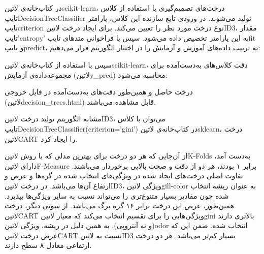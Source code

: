 \documentclass[a4paper,12pt]{article}
\begin{document}
	
در کتاب‌خانه‌ی ‌لاتین{scikit-learn}، درخت‌های تصمیم‌گیری با استفاده از کلاس ‌تایپ{DecisionTreeClassifier} تولید می‌شوند. در ورودی تابع سازنده این کلاس، پارامتر ‌تایپ{criterion} نوع درخت مورد نظر را تعیین می‌کند. برای ایجاد درخت ‌لاتین{ID3}، مقدار ‌تایپ{'entropy'} به این پارامتر تخصیص داده می‌شود. سپس با فراخوانی متد‌های ‌تایپ{fit} و ‌تایپ{predict}، به ترتیب داده‌های آموزش و آزمایش را در اختیار الگوریتم قرار می‌دهیم:
\begin{flushleft}
\end{flushleft}

سپس با استفاده از کتاب‌خانه‌ی ‌لاتین{scikit-learn}، دقت کلاس‌های به‌دست‌آمده برای مجموعه‌داده‌ی آزمایش (‌لاتین{y\_pred}) محاسبه می‌شود:
\begin{flushleft}
\end{flushleft}

درخت حاصل و همین‌طور دقت‌های به‌دست‌آمده در فایل خروجی (‌لاتین{decision\_trees.html}) قابل مشاهده می‌باشند.
	
	
	مشابه الگوریتم تولید درخت ‌لاتین{ID3}، می‌توان با کلاس ‌تایپ{DecisionTreeClassifier(criterion='gini')} در کتاب‌خانه‌ی ‌لاتین{sklearn}، درخت‌ ‌لاتین{CART} را ایجاد کرد.
	
	
	از آن‌جایی که هر دو درخت برای بهترین مدلی که با روش ‌لاتین{K-Folds} به‌دست آمد، دارای ‌لاتین{F-Measure} برابر ۱ بودند، هر دو از دقت و صحت بالایی برخوردار می‌باشند. تفاوت اصلی درخت‌های ایجاد شده در ویژگی‌های انتخاب شده در گره‌ها و عرض و ارتفاع آن‌ها می‌باشد. در درخت ‌لاتین{ID3}، ویژگی ‌لاتین{gill-color} به عنوان ریشه انتخاب شده چون مقادیر بسیار متنوع‌تری را می‌تواند نسبت به سایر ویژگی‌ها بپذیرد. همین‌طور، عرض این درخت برابر ۱۶ گره برگ می‌باشد. از سویی دیگر، درخت ‌لاتین{CART} ویژگی‌هایی را برای تقسیم انتخاب می‌کند که معیار ‌لاتین{gini} بالاتری دارند (و نه آنتروپی). به همین دلیل در ریشه، ویژگی ‌لاتین{odor} انتخاب شده. ضمن این که عرض درخت ‌لاتین{CART} نسبت به ‌لاتین{ID3} بسیار کم‌تر می‌باشد. هر دو درخت ارتفاعی معادل ۸ سطح دارند.
	
\end{document}
